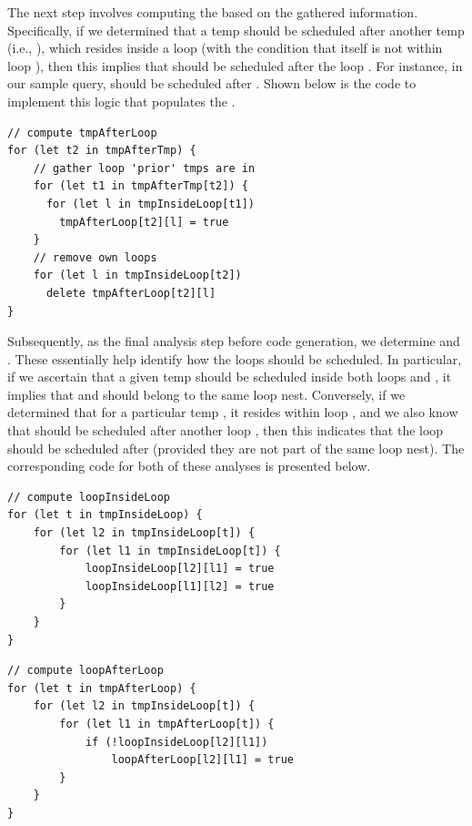 \documentclass[runningheads]{llncs}
\begin{document}
The next step involves computing the  based on the gathered information.
Specifically, if we determined that a temp  should be scheduled after
another temp  (i.e., ), which resides inside a loop 
(with the condition that  itself is not within loop ),
then this implies that  should be scheduled after the loop .
For instance, in our sample query,  should be scheduled after .
Shown below is the code to implement this logic that populates the .

\begin{lstlisting}[style=JavaScript, columns=flexible]
// compute tmpAfterLoop
for (let t2 in tmpAfterTmp) {
    // gather loop 'prior' tmps are in
    for (let t1 in tmpAfterTmp[t2]) {
      for (let l in tmpInsideLoop[t1])
        tmpAfterLoop[t2][l] = true
    }
    // remove own loops
    for (let l in tmpInsideLoop[t2])
      delete tmpAfterLoop[t2][l]
}
\end{lstlisting}

Subsequently, as the final analysis step before code generation, we determine
 and .
These essentially help identify how the loops should be scheduled.
In particular, if we ascertain that a given temp  should be scheduled
inside both loops  and , it implies that  and
 should belong to the same loop nest.
Conversely, if we determined that for a particular temp ,
it resides within loop , and we also know that  should be
scheduled after another loop , then this indicates that the loop 
should be scheduled after  (provided they are not part of the same loop nest).
The corresponding code for both of these analyses is presented below.

\hspace{-18pt}
\begin{minipage}{0.5\textwidth}
\begin{lstlisting}[style=JavaScript, columns=flexible]
// compute loopInsideLoop
for (let t in tmpInsideLoop) {
    for (let l2 in tmpInsideLoop[t]) {
        for (let l1 in tmpInsideLoop[t]) {
            loopInsideLoop[l2][l1] = true
            loopInsideLoop[l1][l2] = true
        }
    }
}
\end{lstlisting}
\end{minipage}%
\begin{minipage}{0.5\textwidth}
\begin{lstlisting}[style=JavaScript, columns=flexible]
// compute loopAfterLoop
for (let t in tmpAfterLoop) {
    for (let l2 in tmpInsideLoop[t]) {
        for (let l1 in tmpAfterLoop[t]) {
            if (!loopInsideLoop[l2][l1])
                loopAfterLoop[l2][l1] = true
        }
    }
}
\end{lstlisting}
\end{minipage}
\end{document}
